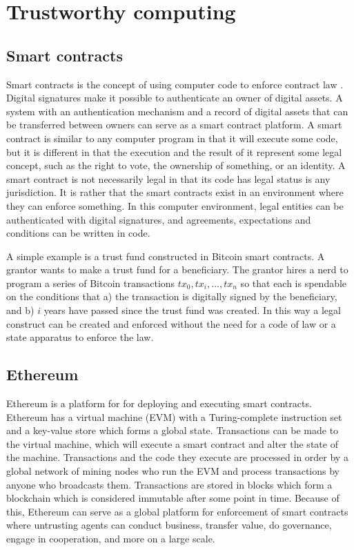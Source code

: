 \section{Trustworthy computing}
\label{sec:trustworthy}

\subsection{Smart contracts}

Smart contracts is the concept of using computer code to enforce contract law \cite{szabo_formalizing_1997}. Digital signatures make it possible to authenticate an owner of digital assets. A system with an authentication mechanism and a record of digital assets that can be transferred between owners can serve as a smart contract platform. A smart contract is similar to any computer program in that it will execute some code, but it is different in that the execution and the result of it represent some legal concept, such as the right to vote, the ownership of something, or an identity. A smart contract is not necessarily legal in that its code has legal status is any jurisdiction. It is rather that the smart contracts exist in an environment where they can enforce something. In this computer environment, legal entities can be authenticated with digital signatures, and agreements, expectations and conditions can be written in code.

A simple example is a trust fund constructed in Bitcoin smart contracts. A grantor wants to make a trust fund for a beneficiary. The grantor hires a nerd to program a series of Bitcoin transactions ${tx_0, tx_i, ..., tx_n}$ so that each is spendable on the conditions that a) the transaction is digitally signed by the beneficiary, and b) $i$ years have passed since the trust fund was created. In this way a legal construct can be created and enforced without the need for a code of law or a state apparatus to enforce the law.

\subsection{Ethereum}

Ethereum \cite{wood2018ethereum} is a platform for for deploying and executing smart contracts. Ethereum has a virtual machine (EVM) with a Turing-complete instruction set and a key-value store which forms a global state. Transactions can be made to the virtual machine, which will execute a smart contract and alter the state of the machine. Transactions and the code they execute are processed in order by a global network of mining nodes who run the EVM and process transactions by anyone who broadcasts them. Transactions are stored in blocks which form a blockchain which is considered immutable after some point in time. Because of this, Ethereum can serve as a global platform for enforcement of smart contracts where untrusting agents can conduct business, transfer value, do governance, engage in cooperation, and more on a large scale.

